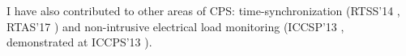 \documentclass[11pt]{article}
\begin{document}
I have also contributed to other areas of CPS:
time-synchronization (RTSS'14 \cite{buevich2013hardware}, RTAS'17 \cite{dongare2017pulsar}) and non-intrusive electrical load
monitoring (ICCSP'13 \cite{rajagopal2013magnetic}, demonstrated at ICCPS'13 \cite{rajagopal2013demo}).





\end{document}
